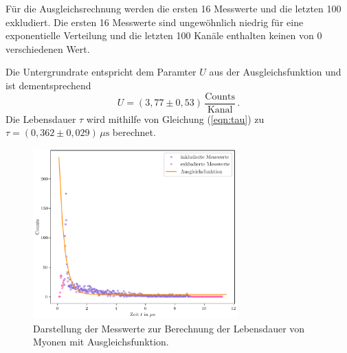 Für die Ausgleichsrechnung werden 
die ersten 16 Messwerte und die letzten 100 exkludiert. Die ersten 16
Messwerte sind ungewöhnlich niedrig für eine exponentielle Verteilung 
und die letzten 100 Kanäle enthalten keinen von 0 verschiedenen Wert. 

Die Untergrundrate entspricht dem Paramter $U$ aus der Ausgleichsfunktion 
und ist dementsprechend $$U = (3,77 \pm 0,53) \, \frac{\text{Counts}}{\text{Kanal}}\,.$$
Die Lebensdauer $\tau$ wird mithilfe von Gleichung (\ref{eqn:tau}) zu 
$\tau = (0,362 \pm 0,029) \, \unit{\mu\second} $ berechnet.

\begin{figure}
  \centering
  \includegraphics[width=0.70\textwidth]{Lebensdauer_der_Myonen.pdf}
  \caption{Darstellung der Messwerte zur Berechnung der Lebensdauer von Myonen mit Ausgleichsfunktion.}
  \label{fig:Lebensdauer_Myonen}
\end{figure}


